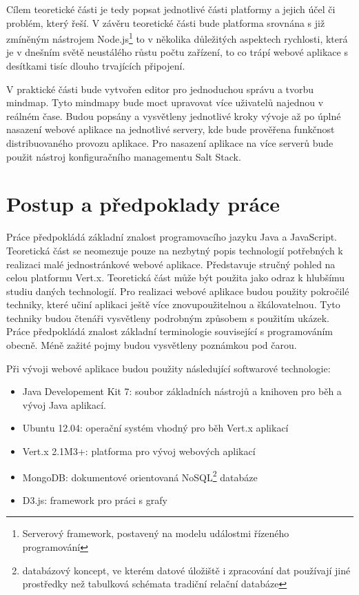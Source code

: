 Cílem teoretické části je tedy popsat jednotlivé části platformy a jejich účel či problém, který řeší. V závěru teoretické části bude platforma srovnána s již zmíněným nástrojem Node.js\footnote{Serverový framework, postavený na modelu událostmi řízeného programování} to v několika důležitých aspektech rychlosti, která je v dnešním světě neustálého růstu počtu zařízení, to co trápí webové aplikace s desítkami tisíc dlouho trvajících připojení.

V praktické části bude vytvořen editor pro jednoduchou správu a tvorbu mindmap. Tyto mindmapy bude moct upravovat více uživatelů najednou v reálném čase. Budou popsány a vysvětleny jednotlivé kroky vývoje až po úplné nasazení webové aplikace na jednotlivé servery, kde bude prověřena funkčnost distribuovaného provozu aplikace. Pro nasazení aplikace na více serverů bude použit nástroj konfiguračního managementu Salt Stack.

\section{Postup a předpoklady práce}

Práce předpokládá základní znalost programovacího jazyku Java a JavaScript. Teoretická část se neomezuje pouze na nezbytný popis technologií potřebných k realizaci malé jednostránkové webové aplikace. Představuje stručný pohled na celou platformu Vert.x. Teoretická část může být použita jako odraz k hlubšímu studiu daných technologií. Pro realizaci webové aplikace budou použity pokročilé techniky, které učiní aplikaci ještě více znovupoužitelnou a škálovatelnou. Tyto techniky budou čtenáři vysvětleny podrobným způsobem s použitím ukázek. Práce předpokládá znalost základní terminologie související s programováním obecně. Méně zažité pojmy budou vysvětleny poznámkou pod čarou.

Při vývoji webové aplikace budou použity následující softwarové technologie:
\begin{itemize}
\item Java Developement Kit 7: soubor základních nástrojů a knihoven pro běh a vývoj Java aplikací.
\item Ubuntu 12.04: operační systém vhodný pro běh Vert.x aplikací
\item Vert.x 2.1M3+: platforma pro vývoj webových aplikací
\item MongoDB: dokumentové orientovaná NoSQL\footnote{databázový koncept, ve kterém datové úložiště i zpracování dat používají jiné prostředky než tabulková schémata tradiční relační databáze} databáze
\item D3.js: framework pro práci s grafy
\end{itemize}